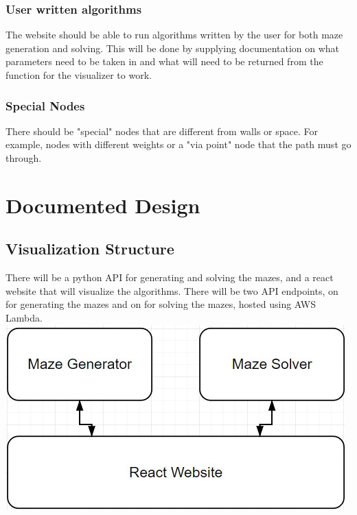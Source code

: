 \documentclass{article}
\begin{document}
\subsubsection{User written algorithms}
The website should be able to run algorithms written by the user for both maze generation and solving. This will be done by supplying documentation on what parameters need to be taken in and what will need to be returned from the function for the visualizer to work.


\subsubsection{Special Nodes}
There should be "special" nodes that are different from walls or space. For example, nodes with different weights or a "via point" node that the path must go through.

\section{Documented Design}
\subsection{Visualization Structure}
There will be a python API for generating and solving the mazes, and a react website that will visualize the algorithms. There will be two API endpoints, on for generating the mazes and on for solving the mazes, hosted using AWS Lambda. 
\includegraphics[width=\linewidth]{assets/structure.jpg}
\end{document}
